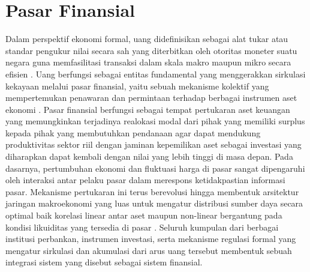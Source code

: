 \section{Pasar Finansial}
Dalam perspektif ekonomi formal, uang didefinisikan sebagai alat tukar atau standar pengukur nilai secara sah yang diterbitkan oleh otoritas moneter suatu negara guna memfasilitasi transaksi dalam skala makro maupun mikro secara efisien \cite{kolmogorov_three_1968}. Uang berfungsi sebagai entitas fundamental yang menggerakkan sirkulasi kekayaan melalui pasar finansial, yaitu sebuah mekanisme kolektif yang mempertemukan penawaran dan permintaan terhadap berbagai instrumen aset ekonomi . Pasar finansial berfungsi sebagai tempat pertukaran aset keuangan yang memungkinkan terjadinya realokasi modal dari pihak yang memiliki surplus kepada pihak yang membutuhkan pendanaan agar dapat mendukung produktivitas sektor riil dengan jaminan kepemilikan aset sebagai investasi yang diharapkan dapat kembali dengan nilai yang lebih tinggi di masa depan. Pada dasarnya, pertumbuhan ekonomi dan fluktuasi harga di pasar sangat dipengaruhi oleh interaksi antar pelaku pasar dalam merespons ketidakpastian informasi pasar. Mekanisme pertukaran ini terus berevolusi hingga membentuk arsitektur jaringan makroekonomi yang luas untuk mengatur distribusi sumber daya secara optimal baik korelasi linear antar aset maupun non-linear bergantung pada kondisi likuiditas yang tersedia di pasar . Seluruh kumpulan dari berbagai institusi perbankan, instrumen investasi, serta mekanisme regulasi formal yang mengatur sirkulasi dan akumulasi dari arus uang tersebut membentuk sebuah integrasi sistem yang disebut sebagai sistem finansial.

